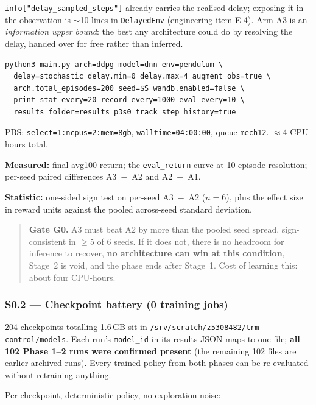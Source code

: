 \documentclass[11pt]{article}
\newcommand{\code}[1]{\texttt{\small #1}}
\newcommand{\gate}[1]{\textcolor{gateamber}{\textbf{#1}}}
\begin{document}
\code{info["delay\_sampled\_steps"]} already carries the realised delay; exposing it in the observation is ${\sim}$10 lines in \code{DelayedEnv} (engineering item E-4). Arm A3 is an \emph{information upper bound}: the best any architecture could do by resolving the delay, handed over for free rather than inferred.

\begin{Verbatim}[fontsize=\footnotesize,frame=single,framesep=6pt,rulecolor=\color{gray}]
python3 main.py arch=ddpg model=dnn env=pendulum \
  delay=stochastic delay.min=0 delay.max=4 augment_obs=true \
  arch.total_episodes=200 seed=$S wandb.enabled=false \
  print_stat_every=20 record_every=1000 eval_every=10 \
  results_folder=results_p3s0 track_step_history=true
\end{Verbatim}

PBS: \code{select=1:ncpus=2:mem=8gb}, \code{walltime=04:00:00}, queue \code{mech12}. $\approx$4 CPU-hours total.

\textbf{Measured:} final avg100 return; the \code{eval\_return} curve at 10-episode resolution; per-seed paired differences A3~$-$~A2 and A2~$-$~A1.

\textbf{Statistic:} one-sided sign test on per-seed A3~$-$~A2 ($n = 6$), plus the effect size in reward units against the pooled across-seed standard deviation.

\begin{quote}
\gate{Gate G0.} A3 must beat A2 by more than the pooled seed spread, sign-consistent in $\geq$5 of 6 seeds. If it does not, there is no headroom for inference to recover, \textbf{no architecture can win at this condition}, Stage~2 is void, and the phase ends after Stage~1. Cost of learning this: about four CPU-hours.
\end{quote}

\subsubsection{S0.2 --- Checkpoint battery (0 training jobs)}

204 checkpoints totalling 1.6\,GB sit in \code{/srv/scratch/z5308482/trm-control/models}. Each run's \code{model\_id} in its results JSON maps to one file; \textbf{all 102 Phase 1--2 runs were confirmed present} (the remaining 102 files are earlier archived runs). Every trained policy from both phases can be re-evaluated without retraining anything.

Per checkpoint, deterministic policy, no exploration noise:
\end{document}

